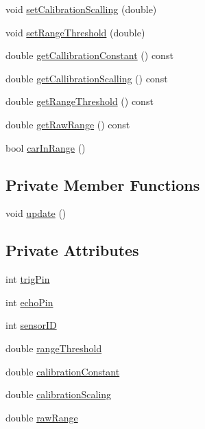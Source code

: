 \begin{DoxyCompactItemize}
\item 
void \mbox{\hyperlink{class_sensor_a662c899f76590071b561eab8f151fdea}{set\+Calibration\+Scalling}} (double)
\item 
void \mbox{\hyperlink{class_sensor_a1ed79291c81c8e11cdb369fd895c42cc}{set\+Range\+Threshold}} (double)
\item 
double \mbox{\hyperlink{class_sensor_a715ecf9ba535991cacc7372073ba1355}{get\+Callibration\+Constant}} () const
\item 
double \mbox{\hyperlink{class_sensor_aa3ed2c53fe69cdf256574edc0ccacdcf}{get\+Callibration\+Scalling}} () const
\item 
double \mbox{\hyperlink{class_sensor_a5c0b861048790221428d0af95c8bdfe4}{get\+Range\+Threshold}} () const
\item 
double \mbox{\hyperlink{class_sensor_a6df3b3905c4a873edb3e820339d75001}{get\+Raw\+Range}} () const
\item 
bool \mbox{\hyperlink{class_sensor_ad8fa0c6ed89be5d735ab9a876fc71932}{car\+In\+Range}} ()
\end{DoxyCompactItemize}
\subsection*{Private Member Functions}
\begin{DoxyCompactItemize}
\item 
void \mbox{\hyperlink{class_sensor_a542a721041768395de2c6e9012622113}{update}} ()
\end{DoxyCompactItemize}
\subsection*{Private Attributes}
\begin{DoxyCompactItemize}
\item 
int \mbox{\hyperlink{class_sensor_a65af6ba8239b1ba96ef2fcbb1931092f}{trig\+Pin}}
\item 
int \mbox{\hyperlink{class_sensor_a7095531fc5ebb17ebddd68e75d45c1fb}{echo\+Pin}}
\item 
int \mbox{\hyperlink{class_sensor_acfc8b807b75d929969a2a9ba32ec4d20}{sensor\+ID}}
\item 
double \mbox{\hyperlink{class_sensor_a3ef8fe9d533d6b9ca9cfbaba5bc072c4}{range\+Threshold}}
\item 
double \mbox{\hyperlink{class_sensor_a370acf36d39381aa3052c84e2d9f8443}{calibration\+Constant}}
\item 
double \mbox{\hyperlink{class_sensor_a36d68507776088618b17ed25ac8d018c}{calibration\+Scaling}}
\item 
double \mbox{\hyperlink{class_sensor_a4b829bf5767bebb0ba4aef3b5bd14bcd}{raw\+Range}}
\end{DoxyCompactItemize}


